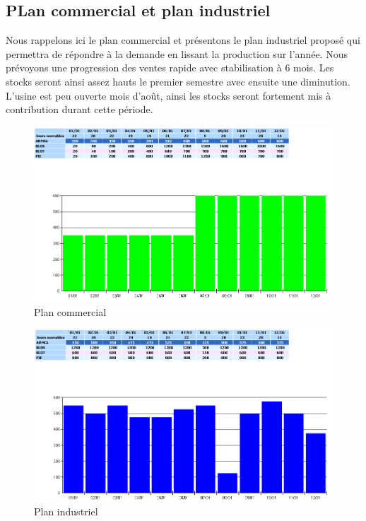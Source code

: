 \documentclass[a4paper]{../TPInsa}
\begin{document}
	\subsection{PLan commercial et plan industriel}
	
	Nous rappelons ici le plan commercial et présentons le plan industriel proposé qui permettra de répondre à la demande en lissant la production sur l'année. Nous prévoyons une progression des ventes rapide avec stabilisation à 6 mois. Les stocks seront ainsi assez hauts le premier semestre avec ensuite une diminution. L'usine est peu ouverte mois d’août, ainsi les stocks seront fortement mis à contribution durant cette période.
	
	\begin{figure}[H]
	\centering
	\includegraphics[scale=0.6]{captures/plan_commercial.PNG}
	\caption{Plan commercial}
	\end{figure}
	
	\begin{figure}[H]
	\centering
	\includegraphics[scale=0.6]{captures/plan_industriel.PNG}
	\caption{Plan industriel}
	\end{figure}
	
\end{document}
